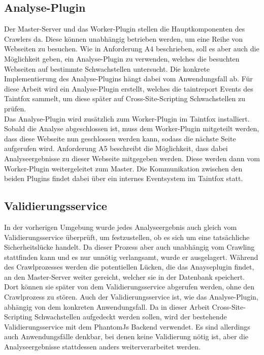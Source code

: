 \subsection{Analyse-Plugin}
Der Master-Server und das Worker-Plugin stellen die Hauptkomponenten des Crawlers da. Diese können unabhängig betrieben werden, um eine Reihe von Webseiten zu besuchen. Wie in Anforderung A4 beschrieben, soll es aber auch die Möglichkeit geben, ein Analyse-Plugin zu verwenden, welches die besuchten Webseiten auf bestimmte Schwachstellen untersucht. Die konkrete Implementierung des Analyse-Plugins hängt dabei vom Anwendungsfall ab. Für diese Arbeit wird ein Analyse-Plugin erstellt, welches die taintreport Events des Taintfox sammelt, um diese später auf Cross-Site-Scripting Schwachstellen zu prüfen. \\
Das Analyse-Plugin wird zusätzlich zum Worker-Plugin im Taintfox installiert. Sobald die Analyse abgeschlossen ist, muss dem Worker-Plugin mitgeteilt werden, dass diese Webseite nun geschlossen werden kann, sodass die nächste Seite aufgerufen wird. Anforderung A5 beschreibt die Möglichkeit, dass dabei Analyseergebnisse zu dieser Webseite mitgegeben werden. Diese werden dann vom Worker-Plugin weitergeleitet zum Master. Die Kommunikation zwischen den beiden Plugins findet dabei über ein internes Eventsystem im Taintfox statt.\\
\subsection{Validierungsservice}
In der vorherigen Umgebung wurde jedes Analyseergebnis auch gleich vom Validierungsservice überprüft, um festzustellen, ob es sich um eine tatsächliche Sicherheitslücke handelt. Da dieser Prozess aber auch unabhängig vom Crawling stattfinden kann und es nur unnötig verlangsamt, wurde er ausgelagert. Während des Crawlprozesses werden die potentiellen Lücken, die das Anayseplugin findet, an den Master-Server weiter gereicht, welcher sie in der Datenbank speichert. Dort können sie später von dem Validierungsservice abgerufen werden, ohne den Crawlprozess zu stören. Auch der Validierungsservice ist, wie das Analyse-Plugin, abhängig von dem konkreten Anwendungsfall. Da in dieser Arbeit Cross-Site-Scripting Schwachstellen aufgedeckt werden sollen, wird der bestehende Validierungsservice mit dem PhantomJs Backend verwendet. Es sind allerdings auch Anwendungsfälle denkbar, bei denen keine Validierung nötig ist, aber die Analyseergebnisse stattdessen anders weiterverarbeitet werden.

